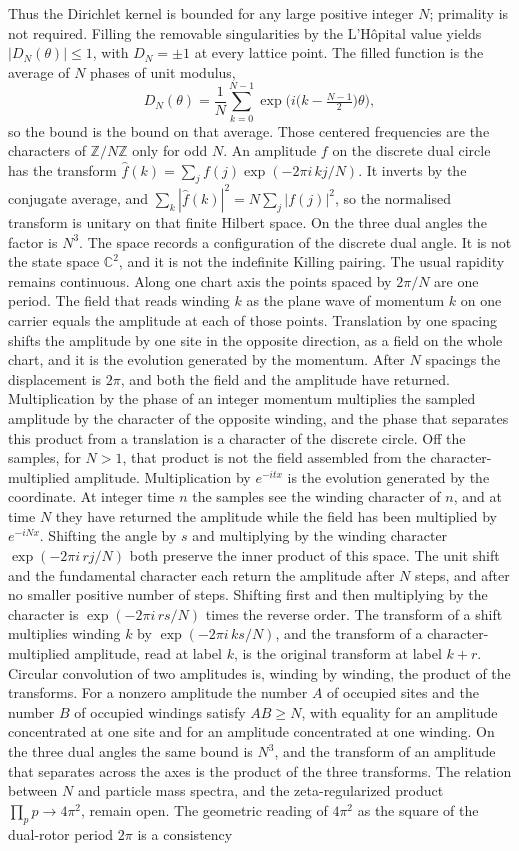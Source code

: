 \documentclass[a4paper]{article}
\begin{document}
Thus the Dirichlet kernel is bounded for any large positive integer $N$; primality is not required. Filling the removable singularities by the L'H\^{o}pital value yields $|D_N(\theta)|\le 1$, with $D_N=\pm 1$ at every lattice point. The filled function is the average of $N$ phases of unit modulus,
\[
D_N(\theta)=\frac1N\sum_{k=0}^{N-1}\exp\bigl(i\bigl(k-\tfrac{N-1}{2}\bigr)\theta\bigr),
\]
so the bound is the bound on that average. Those centered frequencies are the characters of $\mathbb{Z}/N\mathbb{Z}$ only for odd $N$. An amplitude $f$ on the discrete dual circle has the transform $\hat f(k)=\sum_j f(j)\exp(-2\pi i\,kj/N)$. It inverts by the conjugate average, and $\sum_k|\hat f(k)|^2=N\sum_j|f(j)|^2$, so the normalised transform is unitary on that finite Hilbert space. On the three dual angles the factor is $N^3$. The space records a configuration of the discrete dual angle. It is not the state space $\mathbb{C}^2$, and it is not the indefinite Killing pairing. The usual rapidity remains continuous. Along one chart axis the points spaced by \(2\pi/N\) are one period. The field that reads winding \(k\) as the plane wave of momentum \(k\) on one carrier equals the amplitude at each of those points. Translation by one spacing shifts the amplitude by one site in the opposite direction, as a field on the whole chart, and it is the evolution generated by the momentum. After \(N\) spacings the displacement is \(2\pi\), and both the field and the amplitude have returned. Multiplication by the phase of an integer momentum multiplies the sampled amplitude by the character of the opposite winding, and the phase that separates this product from a translation is a character of the discrete circle. Off the samples, for \(N>1\), that product is not the field assembled from the character-multiplied amplitude. Multiplication by \(e^{-itx}\) is the evolution generated by the coordinate. At integer time \(n\) the samples see the winding character of \(n\), and at time \(N\) they have returned the amplitude while the field has been multiplied by \(e^{-iNx}\). Shifting the angle by $s$ and multiplying by the winding character $\exp(-2\pi i\, rj/N)$ both preserve the inner product of this space. The unit shift and the fundamental character each return the amplitude after $N$ steps, and after no smaller positive number of steps. Shifting first and then multiplying by the character is $\exp(-2\pi i\, rs/N)$ times the reverse order. The transform of a shift multiplies winding $k$ by $\exp(-2\pi i\, ks/N)$, and the transform of a character-multiplied amplitude, read at label $k$, is the original transform at label $k+r$. Circular convolution of two amplitudes is, winding by winding, the product of the transforms. For a nonzero amplitude the number $A$ of occupied sites and the number $B$ of occupied windings satisfy $AB\ge N$, with equality for an amplitude concentrated at one site and for an amplitude concentrated at one winding. On the three dual angles the same bound is $N^3$, and the transform of an amplitude that separates across the axes is the product of the three transforms. The relation between $N$ and particle mass spectra, and the zeta-regularized product $\prod_p p\to 4\pi^2$, remain open. The geometric reading of $4\pi^2$ as the square of the dual-rotor period $2\pi$ is a consistency 
\end{document}
